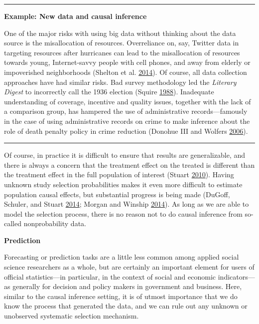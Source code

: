 \documentclass[]{krantz}
\begin{document}
\begin{center}\rule{0.5\linewidth}{\linethickness}\end{center}

\textbf{Example: New data and causal inference}

One of the major risks with using big data without thinking about the
data source is the misallocation of resources. Overreliance on, say,
Twitter data in targeting resources after hurricanes can lead to the
misallocation of resources towards young, Internet-savvy people with
cell phones, and away from elderly or impoverished neighborhoods
(Shelton et al. \protect\hyperlink{ref-shelton2014mapping}{2014}). Of
course, all data collection approaches have had similar risks. Bad
survey methodology led the \emph{Literary Digest} to incorrectly call
the 1936 election (Squire \protect\hyperlink{ref-squire19881936}{1988}).
Inadequate understanding of coverage, incentive and quality issues,
together with the lack of a comparison group, has hampered the use of
administrative records---famously in the case of using administrative
records on crime to make inference about the role of death penalty
policy in crime reduction (Donohue III and Wolfers
\protect\hyperlink{ref-donohue2006uses}{2006}).

\begin{center}\rule{0.5\linewidth}{\linethickness}\end{center}

Of course, in practice it is difficult to ensure that results are
generalizable, and there is always a concern that the treatment effect
on the treated is different than the treatment effect in the full
population of interest (Stuart
\protect\hyperlink{ref-stuart2010matching}{2010}). Having unknown study
selection probabilities makes it even more difficult to estimate
population causal effects, but substantial progress is being made
(DuGoff, Schuler, and Stuart
\protect\hyperlink{ref-dugoff2014generalizing}{2014}; Morgan and Winship
\protect\hyperlink{ref-morgan2014counterfactuals}{2014}). As long as we
are able to model the selection process, there is no reason not to do
causal inference from so-called nonprobability data.

\textbf{Prediction}

Forecasting or prediction tasks are a little less common among applied
social science researchers as a whole, but are certainly an important
element for users of official statistics---in particular, in the context
of social and economic indicators---as generally for decision and policy
makers in government and business. Here, similar to the causal inference
setting, it is of utmost importance that we do know the process that
generated the data, and we can rule out any unknown or unobserved
systematic selection mechanism.
\end{document}
